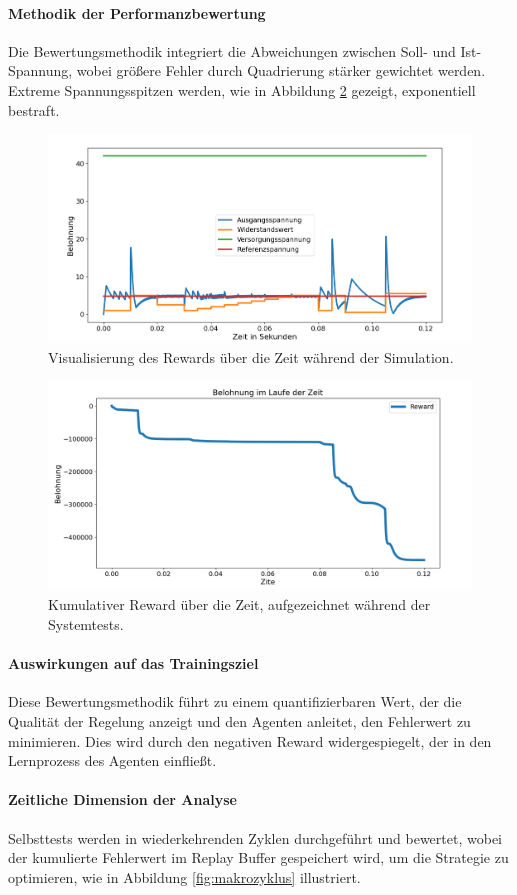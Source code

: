 \paragraph{Methodik der Performanzbewertung}
Die Bewertungsmethodik integriert die Abweichungen zwischen Soll- und Ist-Spannung, wobei größere Fehler durch Quadrierung stärker gewichtet werden. Extreme Spannungsspitzen werden, wie in Abbildung \ref{fig:CumulativeReward} gezeigt, exponentiell bestraft.
\begin{figure}[htbp]
    \centering
    \includegraphics[width=0.99\linewidth]{3Experiment/2Experiment/4Reard_over_time.png.png}
    \caption{Visualisierung des Rewards über die Zeit während der Simulation.}
    \label{fig:RewardOverTime}
\end{figure}
\begin{figure}[htbp]
    \centering
    \includegraphics[width=0.99\linewidth]{3Experiment/2Experiment/4Cumulativer_Reward_Uber_Zeit.png.png}
    \caption{Kumulativer Reward über die Zeit, aufgezeichnet während der Systemtests.}
    \label{fig:CumulativeReward}
\end{figure}

\paragraph{Auswirkungen auf das Trainingsziel}
Diese Bewertungsmethodik führt zu einem quantifizierbaren Wert, der die Qualität der Regelung anzeigt und den Agenten anleitet, den Fehlerwert zu minimieren. Dies wird durch den negativen Reward widergespiegelt, der in den Lernprozess des Agenten einfließt.

\paragraph{Zeitliche Dimension der Analyse}
Selbsttests werden in wiederkehrenden Zyklen durchgeführt und bewertet, wobei der kumulierte Fehlerwert im Replay Buffer gespeichert wird, um die Strategie zu optimieren, wie in Abbildung \ref{fig:makrozyklus} illustriert.

